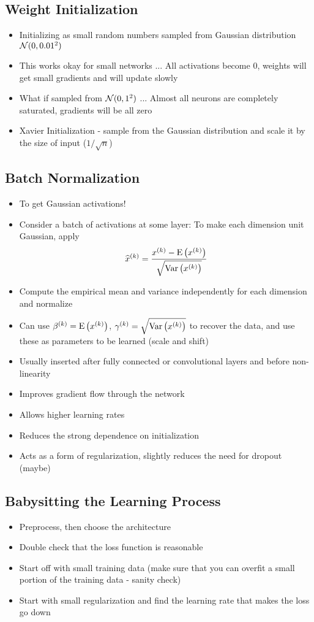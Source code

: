 \subsection{Weight Initialization}
\begin{itemize}
	\item Initializing as small random numbers sampled from Gaussian distribution $\mathcal{N}(0, 0.01^2)$
	\item This works okay for small networks ... All activations become $0$, weights will get small gradients and will update slowly
	\item What if sampled from $\mathcal{N}(0, 1^2)$ ... Almost all neurons are completely saturated, gradients will be all zero
	\item Xavier Initialization - sample from the Gaussian distribution and scale it by the size of input ($1/\sqrt{n}$)
\end{itemize}

\subsection{Batch Normalization}
\begin{itemize}
	\item To get Gaussian activations!
	\item Consider a batch of activations at some layer: To make each dimension unit Gaussian, apply
	$$\widehat{x}^{(k)} = \frac{x^{(k)} - \mathrm{E}\left(x^{(k)}\right)}{\sqrt{\mathrm{Var}\left(x^{(k)}\right)}}$$
	\item Compute the empirical mean and variance independently for each dimension and normalize
	\item Can use $\beta^{(k)} = \mathrm{E}\left(x^{(k)}\right)$, $\gamma^{(k)} = \sqrt{\mathrm{Var}\left(x^{(k)}\right)}$ to recover the data, and use these as parameters to be learned (scale and shift)
	\item Usually inserted after fully connected or convolutional layers and before non-linearity
	\item Improves gradient flow through the network
	\item Allows higher learning rates
	\item Reduces the strong dependence on initialization
	\item Acts as a form of regularization, slightly reduces the need for dropout (maybe)
\end{itemize}

\subsection{Babysitting the Learning Process}
\begin{itemize}
	\item Preprocess, then choose the architecture
	\item Double check that the loss function is reasonable
	\item Start off with small training data (make sure that you can overfit a small portion of the training data - sanity check)
	\item Start with small regularization and find the learning rate that makes the loss go down
\end{itemize}

